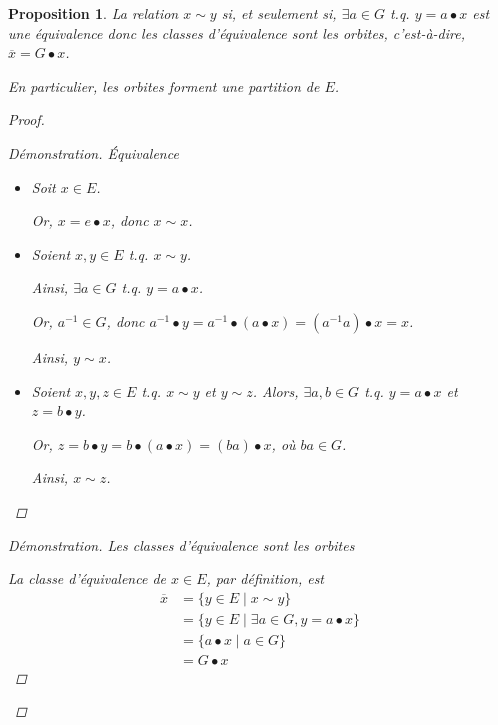 \documentclass{report}
\newtheorem*{prop}{Proposition}
\theoremstyle{definition}
\theoremstyle{remark}
\newenvironment*{subproof}[1][D\'emonstration]
{
\begin{proof}[#1]

}
{
	\renewcommand{\qedsymbol}{$\blacksquare$}
\end{proof}
\renewcommand{\qedsymbol}{$\square$}
}
\begin{document}
	\begin{prop}
		La relation $x \sim y$ si, et seulement si, $\exists a \in G$ t.q. $y=a \bullet x$ est une \'equivalence donc les classes d'\'equivalence sont les orbites, c'est-\`a-dire, $\overline{x} = G \bullet x$.

		En particulier, les orbites forment une \emph{partition} de $E$.
		\begin{proof}~

			\begin{subproof}{\'Equivalence}~

				\begin{itemize}
					\item[(Refl)] Soit $x \in E$.

					Or, $x = e \bullet x$, donc $x \sim x$.
					\item[(Sym)] Soient $x,y \in E$ t.q. $x \sim y$.

					Ainsi, $\exists a \in G$ t.q. $y = a \bullet x$.

					Or, $a^{-1} \in G$, donc $a^{-1} \bullet y = a^{-1} \bullet (a \bullet x) = (a^{-1}a) \bullet x = x$.

					Ainsi, $y \sim x$.
					\item[(Trans)] Soient $x,y,z \in E$ t.q. $x \sim y$ et $y \sim z$. Alors, $\exists a,b \in G$ t.q. $y = a \bullet x$ et $z = b \bullet y$.

					Or, $z = b \bullet y = b \bullet (a \bullet x) = (ba) \bullet x$, o\`u $ba \in G$.

					Ainsi, $x \sim z$.
				\end{itemize}
			\end{subproof}
			\begin{subproof}{Les classes d'\'equivalence sont les orbites}~

				La classe d'\'equivalence de $x \in E$, par d\'efinition, est
				\begin{align*}
					\overline{x} &= \{y \in E \mid x \sim y\}\\
					&= \{y \in E \mid \exists a \in G, y = a \bullet x\}\\
					&= \{a \bullet x \mid a \in G\}\\
					&= G \bullet x
				\end{align*}
			\end{subproof}
		\end{proof}
	\end{prop}
\end{document}
